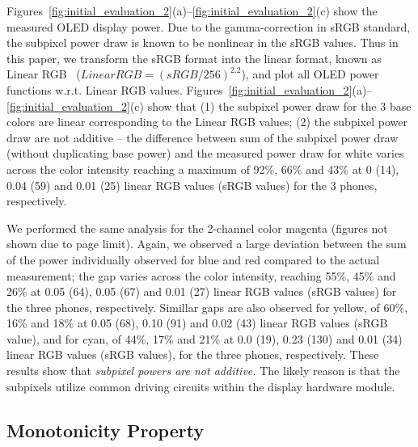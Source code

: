 {
Figures~\ref{fig:initial_evaluation_2}(a)--\ref{fig:initial_evaluation_2}(c)
show the measured OLED display power. Due to the gamma-correction in sRGB standard,
the subpixel power draw is known to be nonlinear in the sRGB values.
Thus in this paper, we transform the sRGB format into the linear format, known as Linear RGB~\cite{gammaCorrection1} ({$Linear RGB = (sRGB/256)^{2.2}$}),
and plot all OLED power functions w.r.t. Linear RGB values.
Figures~\ref{fig:initial_evaluation_2}(a)--\ref{fig:initial_evaluation_2}(c) show that
(1) the subpixel power draw for the 3 base colors are linear corresponding to the Linear RGB values;
(2) the subpixel power draw are not additive -- 
the difference between sum of the subpixel power draw (without duplicating base power)
and the measured power draw for white
varies across the color intensity reaching
a maximum of 92\%, 66\% and 43\% at
0 (14), 0.04 (59) and 0.01 (25) linear RGB values (sRGB values) for the 3 phones, respectively.


We performed the same analysis for the 2-channel color magenta
(figures not shown due to page limit). Again, we
observed a large deviation between the sum of the power individually observed for blue and
red compared to the actual measurement; the gap
varies across the color intensity, reaching
55\%, 45\% and 26\% at 0.05 (64), 0.05 (67) and 0.01 (27) linear RGB values (sRGB values)
for the three phones, respectively.
Simillar gaps are also observed for yellow, \eg of
60\%, 16\% and 18\% at 0.05 (68), 0.10 (91) and 0.02 (43) linear RGB values (sRGB value),
and for cyan, of
44\%, 17\% and 21\% at 0.0 (19), 0.23 (130) and 0.01 (34) linear RGB values (sRGB values),
for the three phones, respectively.
These results show that
%
{\em subpixel powers are not additive.} The likely reason is that the
  subpixels utilize common driving circuits within the display
  hardware module.
}
  
\subsection{Monotonicity Property}
\label{subsec:monoproperty}

